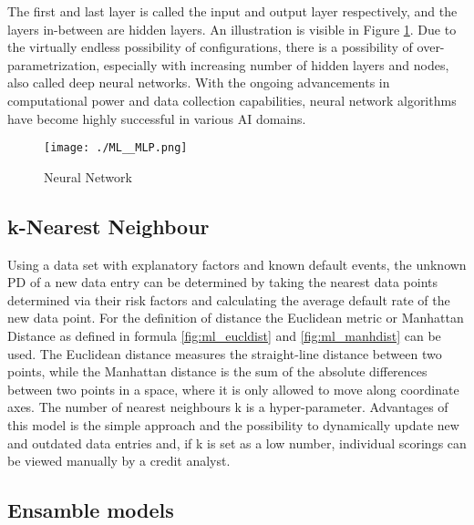 The first and last layer is called the input and output layer respectively, and the layers in-between are hidden layers. An illustration is visible in Figure \ref{fig:ml_neurnet}. Due to the virtually endless possibility of configurations, there is a possibility of over-parametrization, especially with increasing number of hidden layers and nodes, also called deep neural networks. With the ongoing advancements in computational power and data collection capabilities, neural network algorithms have become highly successful in various AI domains.

\begin{figure}[H]
	\centering
	\texttt{[image: ./ML\_\_MLP.png]}
    \caption{Neural Network}
    \label{fig:ml_neurnet}
\end{figure}

\subsection{k-Nearest Neighbour}
\label{sec:kNN}
Using a data set with explanatory factors and known default events, the unknown PD of a new data entry can be determined by taking the nearest data points determined via their risk factors and calculating the average default rate of the new data point. For the definition of distance the Euclidean metric or Manhattan Distance as defined in formula \ref{fig:ml_eucldist} and \ref{fig:ml_manhdist} can be used. The Euclidean distance measures the straight-line distance between two points, while the Manhattan distance is the sum of the absolute differences between two points in a space, where it is only allowed to move along coordinate axes. The number of nearest neighbours k is a hyper-parameter. Advantages of this model is the simple approach and the possibility to dynamically update new and outdated data entries and, if k is set as a low number, individual scorings can be viewed manually by a credit analyst. 

\subsection{Ensamble models}
